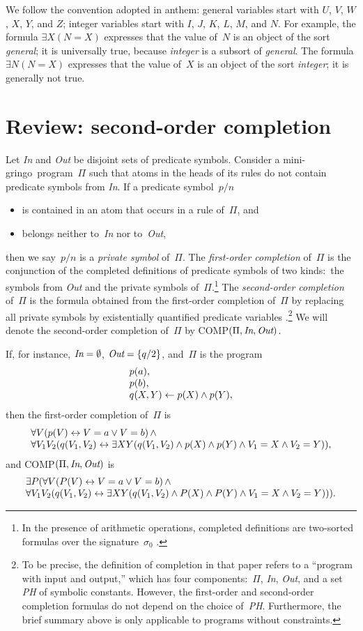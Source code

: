 \documentclass{article}
\def\ar{\leftarrow}
\def\lrar{\leftrightarrow}
\def\ba{\begin{array}}
\def\ea{\end{array}}
\def\gringo{{\sc gringo}}
\begin{document}
We follow the convention adopted in {\sc anthem\/}:
general variables start with $U$, $V$, $W$, $X$, $Y$, and $Z$;
integer variables start with $I$, $J$, $K$, $L$, $M$, and $N$.
For example, the formula
$\exists X (N=X)$ expresses that the value of~$N$ is an object of the sort
\emph{general\/};  it is universally true, because \emph{integer} is a
subsort of \emph{general}.  The formula
$\exists N (N=X)$ expresses that the value of~$X$ is an object of the sort
\emph{integer\/}; it is generally not true.

\section{Review: second-order completion} \label{appb}

Let \emph{In} and \emph{Out} be disjoint sets of predicate symbols.
Consider a mini-\gringo\ program~$\Pi$ such that atoms in the heads of
its rules do not contain predicate symbols from \emph{In}.
If a predicate symbol~$p/n$
\begin{itemize}
\item is contained in an atom that occurs in a rule of~$\Pi$, and
\item belongs neither to~\emph{In} nor to~\emph{Out},
\end{itemize}
then we say~$p/n$ is a \emph{private symbol} of~$\Pi$.  The
\emph{first-order completion} of~$\Pi$ is the conjunction of the completed
definitions of predicate symbols of two kinds:~the symbols from \emph{Out}
and the private symbols
of~$\Pi$.\footnote{In the presence of arithmetic operations, completed
  definitions are two-sorted formulas over the signature~$\sigma_0$
  \cite[Section~6.1]{fan20}.}
The \emph{second-order completion} of~$\Pi$ is the formula obtained from
the first-order completion of~$\Pi$ by replacing all private symbols by
existentially quantified predicate variables
\cite[Section~2.5]{fan22}.\footnote{To be precise, the definition of
  completion in that paper refers to a
  ``program with input and output,'' which has four
  components:~$\Pi$, \emph{In}, \emph{Out}, and a set \emph{PH} of
  symbolic constants.  However, the first-order and second-order
  completion formulas do not depend on the choice of~\emph{PH}.  Furthermore,
  the brief summary above is only applicable to programs without constraints.}
We will denote the second-order completion of~$\Pi$ by
COMP$(\Pi,\emph{In},\emph{Out})$.

If, for instance, $\emph{In}=\emptyset$, $\emph{Out}=\{q/2\}$, and~$\Pi$
is the program
$$
\ba l
p(a),\\
p(b),\\
q(X,Y) \ar p(X) \land p(Y),
\ea$$
then the first-order completion of~$\Pi$ is
$$\ba l
\forall V(p(V) \lrar V=a \lor V=b)\,\land\\
\forall V_1V_2(q(V_1,V_2) \lrar \exists XY(q(V_1,V_2) \land p(X) \land p(Y)
\land V_1=X \land V_2=Y)),
\ea$$
and COMP$(\Pi,\emph{In},\emph{Out})$ is
$$
\ba l
\exists P(\forall V(P(V) \lrar V=a \lor V=b)\,\land\\
\forall V_1V_2(q(V_1,V_2) \lrar \exists XY(q(V_1,V_2) \land
P(X) \land P(Y) \land V_1=X \land V_2=Y))).
\ea
$$
\end{document}
